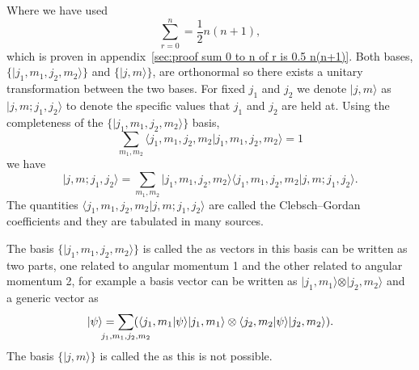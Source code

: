 \documentclass[a4paper]{article}
\renewcommand{\ket}[1]{\vert {#1} \rangle}
\renewcommand{\braket}[2]{\langle {#1} \vert {#2} \rangle}
\renewcommand{\ident}{1}
\newcommand{\tensorProd}{\otimes}
\theoremstyle{definition}
\begin{document}
    Where we have used
    \[\sum_{r = 0}^n = \frac{1}{2}n(n + 1),\]
    which is proven in appendix~\ref{sec:proof sum 0 to n of r is 0.5 n(n+1)}.
    Both bases, \(\{\ket{j_1, m_1, j_2, m_2}\}\) and \(\{\ket{j, m}\}\), are orthonormal so there exists a unitary transformation between the two bases.
    For fixed \(j_1\) and \(j_2\) we denote \(\ket{j, m}\) as \(\ket{j, m; j_1, j_2}\) to denote the specific values that \(j_1\) and \(j_2\) are held at.
    Using the completeness of the \(\{\ket{j_1, m_1, j_2, m_2}\}\) basis,
    \[\sum_{m_1, m_2} \braket{j_1, m_1, j_2, m_2}{j_1, m_1, j_2, m_2} = \ident\]
    we have
    \[\ket{j, m; j_1, j_2} = \sum_{m_1, m_2} \ket{j_1, m_1, j_2, m_2}\braket{j_1, m_1, j_2, m_2}{j, m; j_1, j_2}.\]
    The quantities \(\braket{j_1, m_1, j_2, m_2}{j, m; j_1, j_2}\) are called the Clebsch--Gordan coefficients and they are tabulated in many sources.
    
    The basis \(\{\ket{j_1, m_1, j_2, m_2}\}\) is called the  as vectors in this basis can be written as two parts, one related to angular momentum 1 and the other related to angular momentum 2, for example a basis vector can be written as \(\ket{j_1, m_1}\tensorProd\ket{j_2, m_2}\) and a generic vector as
    \[\ket{\psi} = \sum_{\mathclap{j_1, m_1, j_2, m_2}}(\braket{j_1, m_1}{\psi}\ket{j_1, m_1} \tensorProd\braket{j_2, m_2}{\psi}\ket{j_2, m_2}).\]
    The basis \(\{\ket{j, m}\}\) is called the  as this is not possible.
    
\end{document}
